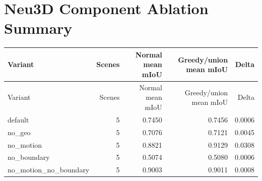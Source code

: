\documentclass[10pt]{article}
\begin{document}
\section{Neu3D Component Ablation Summary}
\small
\begin{longtable}{lrrrr}
\toprule
Variant & Scenes & Normal mean mIoU & Greedy/union mean mIoU & Delta \\
\midrule
\endfirsthead
\toprule
Variant & Scenes & Normal mean mIoU & Greedy/union mean mIoU & Delta \\
\midrule
\endhead
default & 5 & 0.7450 & 0.7456 & 0.0006 \\
no\_geo & 5 & 0.7076 & 0.7121 & 0.0045 \\
no\_motion & 5 & 0.8821 & 0.9129 & 0.0308 \\
no\_boundary & 5 & 0.5074 & 0.5080 & 0.0006 \\
no\_motion\_no\_boundary & 5 & 0.9003 & 0.9011 & 0.0008 \\
\bottomrule
\end{longtable}
\normalsize
\end{document}
